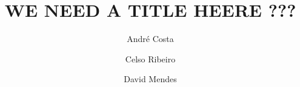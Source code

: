 \title{WE NEED A TITLE HEERE ???}

\author[first]{André Costa}
\author[second]{Celso Ribeiro}
\author[third]{David Mendes}
